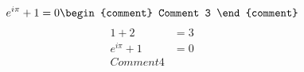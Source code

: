 \documentclass{article}
\begin{document}
\[
    e^{i \pi} + 1 = 0 %
    \begin{comment}
    Comment 3
    \end{comment}
\]
\begin{align*}
    1 + 2 & = 3 \\
    e^{i \pi} + 1 & = 0 \\
    Comment 4
\end{align*}
\end{document}
